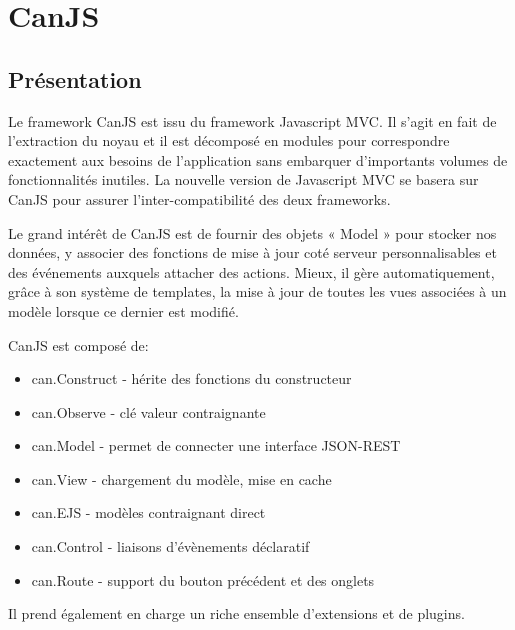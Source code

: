 \section{CanJS}
\label{ch:canjs}

\subsection{Présentation}

Le framework CanJS est issu du framework Javascript MVC. Il s'agit en fait de l'extraction du noyau et il est décomposé en modules pour correspondre exactement aux besoins de l’application sans embarquer d'importants volumes de fonctionnalités inutiles. La nouvelle version de Javascript MVC se basera sur CanJS pour assurer l’inter-compatibilité des deux frameworks.

Le grand intérêt de CanJS est de fournir des objets « Model » pour stocker nos données, y associer des fonctions de mise à jour coté serveur personnalisables et des événements auxquels attacher des actions. Mieux, il gère automatiquement, grâce à son système de templates, la mise à jour de toutes les vues associées à un modèle lorsque ce dernier est modifié.

CanJS est composé de:
\begin{itemize}

    \item[\textbullet]
can.Construct - hérite des fonctions du constructeur

\item[\textbullet]
    can.Observe - clé valeur contraignante

\item[\textbullet]
    can.Model - permet de connecter une interface JSON-REST

\item[\textbullet]
    can.View - chargement du modèle, mise en cache

\item[\textbullet]
    can.EJS - modèles contraignant direct

\item[\textbullet]
    can.Control - liaisons d’évènements déclaratif
    
\item[\textbullet]
    can.Route - support du bouton précédent et des onglets
    
\end{itemize}

Il prend également en charge un riche ensemble d’extensions et de plugins.

